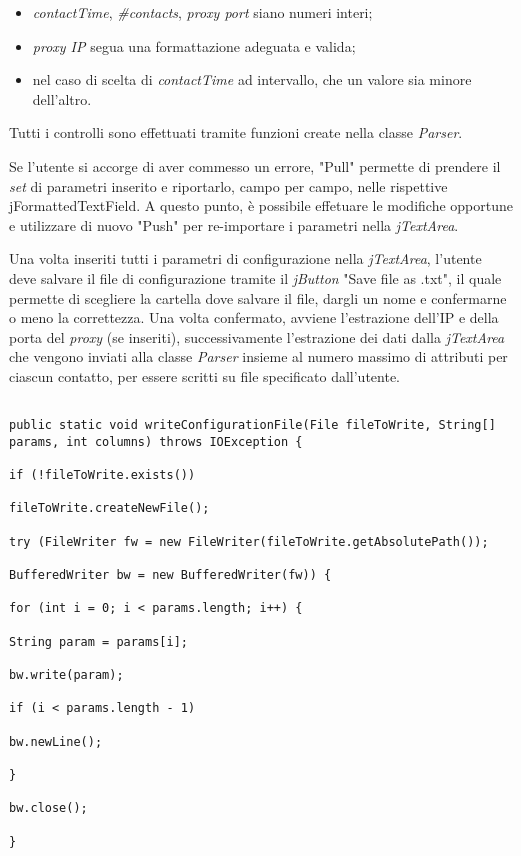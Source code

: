 \begin{itemize}

\item \textit{contactTime}, \textit{\#contacts}, \textit{proxy port} siano numeri interi;

\item \textit{proxy IP} segua una formattazione adeguata e valida;

\item nel caso di scelta di \textit{contactTime} ad intervallo, che un valore sia minore dell'altro.

\end{itemize}

Tutti i controlli sono effettuati tramite funzioni create nella classe \textit{Parser}.


Se l'utente si accorge di aver commesso un errore, "Pull" permette di prendere il \textit{set} di parametri inserito e riportarlo, campo per campo, nelle rispettive {jFormattedTextField}. A questo punto, \`{e} possibile effetuare le modifiche opportune e utilizzare di nuovo "Push" per re-importare i parametri nella \textit{jTextArea}. 


Una volta inseriti tutti i parametri di configurazione nella \textit{jTextArea}, l'utente deve salvare il file di configurazione tramite il \textit{jButton} "Save file as .txt", il quale permette di scegliere la cartella dove salvare il file, dargli un nome e confermarne o meno la correttezza. Una volta confermato, avviene l'estrazione dell'IP e della porta del \textit{proxy} (se inseriti), successivamente l'estrazione dei dati dalla \textit{jTextArea} che vengono inviati alla classe \textit{Parser} insieme al numero massimo di attributi per ciascun contatto, per essere scritti su file specificato dall'utente.


\vspace{0.5cm}

\begin{lstlisting}

public static void writeConfigurationFile(File fileToWrite, String[] params, int columns) throws IOException {

if (!fileToWrite.exists())

fileToWrite.createNewFile();

try (FileWriter fw = new FileWriter(fileToWrite.getAbsolutePath()); 

BufferedWriter bw = new BufferedWriter(fw)) {

for (int i = 0; i < params.length; i++) {

String param = params[i];

bw.write(param);

if (i < params.length - 1)

bw.newLine();

} 

bw.close();     

}

\end{lstlisting}


